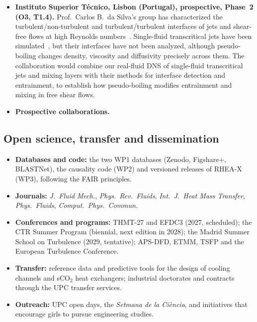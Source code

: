 \documentclass[11pt]{article}
\begin{document}
\begin{itemize}
  Prof.\ M.\ Ihme: BLASTNet); ICM-CSIC Barcelona (microplastics and biofilms); BSC
  (hackathons).
  \item \textbf{Instituto Superior T\'ecnico, Lisbon (Portugal), prospective, Phase~2 (O3,
  T1.4).} Prof.\ Carlos B.\ da Silva's group has characterized the turbulent/non-turbulent and turbulent/turbulent
  interfaces of jets and shear-free flows at high Reynolds numbers~\cite{Silva2018,Alves2025}.
  Single-fluid transcritical jets have been simulated~\cite{Lapenna2019,Ream2025},
  but their interfaces have not been analyzed, although pseudo-boiling changes density,
  viscosity and diffusivity precisely across them. The collaboration would combine our
  real-fluid DNS of single-fluid transcritical jets and mixing layers with their methods for
  interface detection and entrainment, to establish how pseudo-boiling modifies entrainment
  and mixing in free shear flows.
  \item \textbf{Prospective collaborations.} 
\end{itemize}

\subsection{Open science, transfer and dissemination}\label{sec:dissemination}
\begin{itemize}
  \item \textbf{Databases and code:} the two WP1 databases (Zenodo, Figshare+, BLASTNet), the
  causality code (WP2) and versioned releases of RHEA-X (WP3), following the FAIR principles.
  \item \textbf{Journals:} \emph{J.\ Fluid Mech.}, \emph{Phys.\ Rev.\ Fluids}, \emph{Int.\ J.\
  Heat Mass Transfer}, \emph{Phys.\ Fluids}, \emph{Comput.\ Phys.\ Commun.}
  \item \textbf{Conferences and programs:} THMT-27 and EFDC3 (2027, scheduled); the CTR Summer
  Program (biennial, next edition in 2028); the Madrid Summer School on Turbulence (2029,
  tentative); APS-DFD, ETMM, TSFP and the European Turbulence Conference.
  \item \textbf{Transfer:} reference data and predictive tools for the design of cooling
  channels and sCO$_2$ heat exchangers; industrial doctorates and contracts through the UPC
  transfer services.
  \item \textbf{Outreach:} UPC open days, the \emph{Setmana de la Ci\`encia}, and initiatives
  that encourage girls to pursue engineering studies.
\end{itemize}
\end{document}
